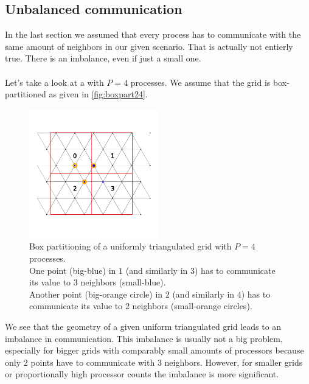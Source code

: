 \subsection{Unbalanced communication}
In the last section we assumed that every process has to communicate with the same amount of neighbors in our given scenario. That is actually not entierly true. There is an imbalance, even if just a small one.\\ 
\\
Let's take a look at a  with $P=4$ processes. We assume that the grid is box-partitioned as given in \autoref{fig:boxpart24}.\\
\begin{figure}[H]
    \centering
    \includegraphics[width=0.5\textwidth]{../fig/lab2/grid24.png}
    \caption{Box partitioning of a uniformly triangulated grid with $P=4$ processes.\\
    One point (big-blue) in $1$ (and similarly in $3$) has to communicate its value to 3 neighbors (small-blue).\\
    Another point (big-orange circle) in $2$ (and similarly in $4$) has to communicate its value to 2 neighbors (small-orange circles).}
    \label{fig:boxpart24}
\end{figure}
We see that the geometry of a given uniform triangulated grid leads to an imbalance in communication. This imbalance is usually not a big problem, especially for bigger grids with comparably small amounts of processors because only 2 points have to communicate with 3 neighbors. However, for smaller grids or proportionally high processor counts the imbalance is more significant.\\ 

